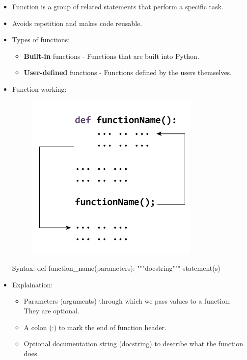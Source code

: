 \setlength{\columnsep}{3pt}
\begin{flushleft}
	
	\begin{itemize}
		\item Function is a group of related statements that perform a specific task.
		\item Avoids repetition and makes code reusable. 
		\item Types of functions:
		\begin{itemize}
			\item \textbf{Built-in} functions - Functions that are built into Python.
			\item \textbf{User-defined} functions - Functions defined by the users themselves.
		\end{itemize}
		
		\bigskip
		\item Function working:
		\begin{figure}[h!]
			\centering
			\includegraphics[scale=0.8]{content/chapter6/images/function.png}
		\end{figure}
		
		\begin{tcolorbox}[breakable,notitle,boxrule=1pt,colback=pink,colframe=pink]
			\color{black}
			\font=8pt
			Syntax: 
			\newline
			def function\_name(parameters):
			 \newline
			\hphantom{} \hphantom{} """docstring"""
			\newline
			\hphantom{} \hphantom{} statement(s)
			\font=4pt
		\end{tcolorbox}			
		
		\item Explaination:
		\begin{itemize}
			\item Parameters (arguments) through which we pass values to a function. They are
			optional.
			\item A colon (:) to mark the end of function header.
			\item Optional documentation string (docstring) to describe what the function does.
		\end{itemize}
		

\end{itemize}
\end{flushleft}
